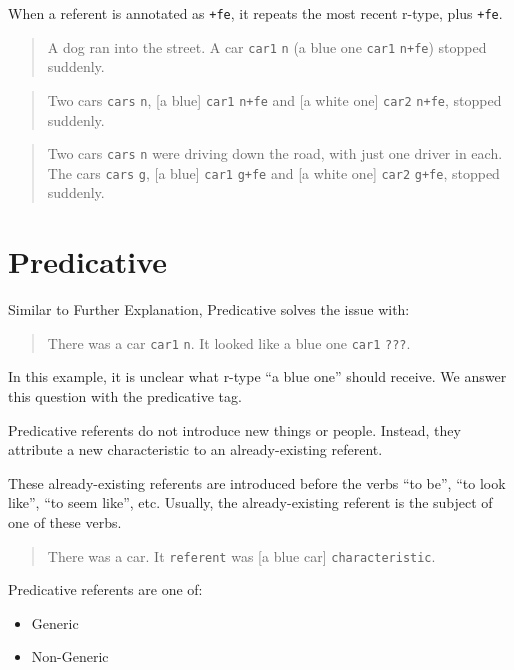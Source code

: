 \documentclass[
]{book}
\providecommand{\tightlist}{%
  \setlength{\itemsep}{0pt}\setlength{\parskip}{0pt}}
\begin{document}
When a referent is annotated as \texttt{+fe}, it repeats the most recent r-type, plus \texttt{+fe}.

\begin{quote}
A dog ran into the street. A car \texttt{car1} \texttt{n} (a blue one \texttt{car1} \texttt{n+fe}) stopped suddenly.
\end{quote}

\begin{quote}
Two cars \texttt{cars} \texttt{n},
{[}a blue{]} \texttt{car1} \texttt{n+fe} and {[}a white one{]} \texttt{car2} \texttt{n+fe},
stopped suddenly.
\end{quote}

\begin{quote}
Two cars \texttt{cars} \texttt{n} were driving down the road,
with just one driver in each.
The cars \texttt{cars} \texttt{g},
{[}a blue{]} \texttt{car1} \texttt{g+fe} and {[}a white one{]} \texttt{car2} \texttt{g+fe},
stopped suddenly.
\end{quote}

\hypertarget{predicative}{%
\section{Predicative}\label{predicative}}

Similar to Further Explanation, Predicative solves the issue with:

\begin{quote}
There was a car \texttt{car1} \texttt{n}. It looked like a blue one \texttt{car1} \texttt{???}.
\end{quote}

In this example, it is unclear what r-type ``a blue one'' should receive.
We answer this question with the predicative tag.

Predicative referents do not introduce new things or people.
Instead,
they attribute a new characteristic to an already-existing referent.

These already-existing referents are introduced
before the verbs ``to be'', ``to look like'', ``to seem like'', etc.
Usually,
the already-existing referent is the subject of one of these verbs.

\begin{quote}
There was a car.
It \texttt{referent} was {[}a blue car{]} \texttt{characteristic}.
\end{quote}

Predicative referents are one of:

\begin{itemize}
\tightlist
\item
  Generic
\item
  Non-Generic
\end{itemize}
\end{document}
